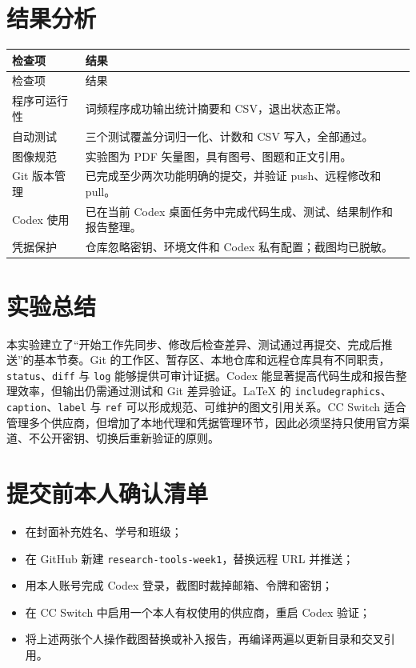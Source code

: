 \documentclass[UTF8,a4paper,zihao=-4]{ctexart}
\begin{document}
\section{结果分析}

\begin{longtable}{p{3.2cm}p{10.5cm}}
  \toprule
  检查项 & 结果 \\
  \midrule
  \endfirsthead
  \toprule
  检查项 & 结果 \\
  \midrule
  \endhead
  程序可运行性 & 词频程序成功输出统计摘要和 CSV，退出状态正常。 \\
  自动测试 & 三个测试覆盖分词归一化、计数和 CSV 写入，全部通过。 \\
  图像规范 & 实验图为 PDF 矢量图，具有图号、图题和正文引用。 \\
  Git 版本管理 & 已完成至少两次功能明确的提交，并验证 push、远程修改和 pull。 \\
  Codex 使用 & 已在当前 Codex 桌面任务中完成代码生成、测试、结果制作和报告整理。 \\
  凭据保护 & 仓库忽略密钥、环境文件和 Codex 私有配置；截图均已脱敏。 \\
  \bottomrule
\end{longtable}

\section{实验总结}

本实验建立了“开始工作先同步、修改后检查差异、测试通过再提交、完成后推送”的基本节奏。Git 的工作区、暂存区、本地仓库和远程仓库具有不同职责，\texttt{status}、\texttt{diff} 与 \texttt{log} 能够提供可审计证据。Codex 能显著提高代码生成和报告整理效率，但输出仍需通过测试和 Git 差异验证。LaTeX 的 \texttt{includegraphics}、\texttt{caption}、\texttt{label} 与 \texttt{ref} 可以形成规范、可维护的图文引用关系。CC Switch 适合管理多个供应商，但增加了本地代理和凭据管理环节，因此必须坚持只使用官方渠道、不公开密钥、切换后重新验证的原则。

\section*{提交前本人确认清单}

\begin{itemize}[leftmargin=2.5em]
  \item 在封面补充姓名、学号和班级；
  \item 在 GitHub 新建 \texttt{research-tools-week1}，替换远程 URL 并推送；
  \item 用本人账号完成 Codex 登录，截图时裁掉邮箱、令牌和密钥；
  \item 在 CC Switch 中启用一个本人有权使用的供应商，重启 Codex 验证；
  \item 将上述两张个人操作截图替换或补入报告，再编译两遍以更新目录和交叉引用。
\end{itemize}
\end{document}
